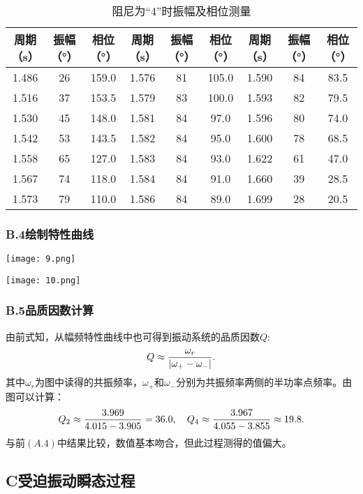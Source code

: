 \documentclass{ctexart}
\begin{document}
\begin{table}[!htbp]
  \centering
  \caption{阻尼为“4”时振幅及相位测量}\vspace{1em} \label{tab:aStrangeTable}%
  \begin{tabular}{ccc|ccc|ccc}
  \toprule
  周期（s）& 振幅（°）& 相位（°）& 周期（s）& 振幅（°）& 相位（°）& 周期（s）& 振幅（°）& 相位（°）\\ 
  \midrule
  1.486& 26& 159.0& 1.576& 81& 105.0& 1.590& 84& 83.5\\
  1.516& 37& 153.5& 1.579& 83& 100.0& 1.593& 82& 79.5\\
  1.530& 45& 148.0& 1.581& 84&  97.0& 1.596& 80& 74.0\\
  1.542& 53& 143.5& 1.582& 84&  95.0& 1.600& 78& 68.5\\
  1.558& 65& 127.0& 1.583& 84&  93.0& 1.622& 61& 47.0\\
  1.567& 74& 118.0& 1.584& 84&  91.0& 1.660& 39& 28.5\\
  1.573& 79& 110.0& 1.586& 84&  89.0& 1.699& 28& 20.5\\
  \bottomrule
  \end{tabular}
  \end{table}

\subsubsection*{B.4\quad 绘制特性曲线}

\texttt{[image: 9.png]}

\texttt{[image: 10.png]}


\subsubsection*{B.5\quad 品质因数计算}
由前式知，从幅频特性曲线中也可得到振动系统的品质因数$Q$:
\begin{equation}
  Q \approx \frac{\omega_r}{|\omega_{+}-\omega_{-}|}. \notag
\end{equation}
其中$\omega_r$为图中读得的共振频率，$\omega_{+}$和$\omega_{-}$分别为共振频率两侧的半功率点频率。由图可以计算：
\begin{equation}
  Q_2 \approx \frac{3.969}{4.015-3.905}=36.0, \quad Q_4 \approx \frac{3.967}{4.055-3.855} \approx 19.8. \notag
\end{equation}
与前$(A.4)$中结果比较，数值基本吻合，但此过程测得的值偏大。


\subsection*{C\quad 受迫振动瞬态过程}
\end{document}
